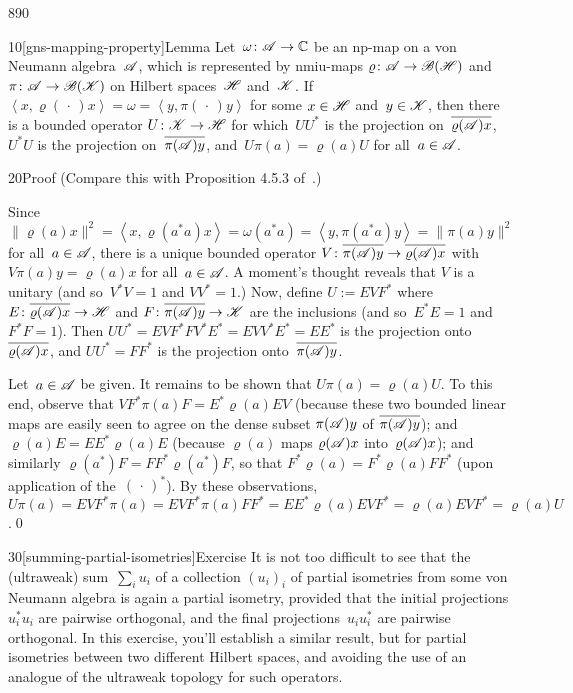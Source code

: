 \begin{parsec}{890}%
\begin{point}{10}[gns-mapping-property]{Lemma}%
Let~$\omega\colon \mathscr{A}\to\mathbb{C}$
be an np-map on a von Neumann algebra~$\mathscr{A}$,
which is represented by nmiu-maps
$\varrho\colon \mathscr{A}\to\mathscr{B}(\mathscr{H})$
and $\pi\colon \mathscr{A}\to\mathscr{B}(\mathscr{K})$
on Hilbert spaces~$\mathscr{H}$ and~$\mathscr{K}$.
If $\left<x,\varrho(\,\cdot\,)x\right>
=\omega=\left<y,\pi(\,\cdot\,)y\right>$
for some  $x\in\mathscr{H}$ and~$y\in\mathscr{K}$,
then there is a bounded operator $U\colon \mathscr{K}\to\mathscr{H}$
for which~$UU^*$ is the projection
on~$\overline{\varrho(\mathscr{A})x}$,
$U^*U$ is the projection
on~$\overline{\pi(\mathscr{A})y}$,
and~$U\pi(a)=\varrho(a)U$
for all~$a\in\mathscr{A}$.
\begin{point}{20}{Proof}%
(Compare this with Proposition 4.5.3 of~\cite{kr}.)

Since $\|\varrho(a)x\|^2
= \left<x,\varrho(a^*a)x\right>
=\omega(a^*a)=\left<y,\pi(a^*a)y\right>
= \|\pi(a)y\|^2$ for all~$a\in\mathscr{A}$,
there is a unique bounded operator $V\colon \overline{\pi(\mathscr{A})y}
\to \overline{\varrho(\mathscr{A})x}$
with $V\pi(a)y = \varrho(a)x$ for all~$a\in\mathscr{A}$.
A moment's thought reveals
	that $V$ is a unitary (and so~$V^*V=1$ and $VV^*=1$.)
Now, define $U:=EVF^*$
where $E\colon \overline{\varrho(\mathscr{A})x}\to\mathscr{H}$
and $F\colon \overline{\pi(\mathscr{A})y}\to\mathscr{K}$
are the inclusions
(and so~$E^*E=1$ and~$F^*F=1$).
Then $UU^*= EVF^*FV^*E^*=EVV^*E^*=EE^*$
is the projection onto~$\overline{\varrho(\mathscr{A})x}$,
and $UU^*=FF^*$
is the projection onto~$\overline{\pi(\mathscr{A})y}$.

Let~$a\in\mathscr{A}$ be given.
It remains to be shown that
$U\pi(a)=\varrho(a)U$.
To this end,
observe that
$V F^* \pi(a) F = E^* \varrho(a) E V$
(because 
these two bounded linear maps
are easily seen to
agree on the dense subset $\pi(\mathscr{A})y$
of $\overline{\pi(\mathscr{A})y}$);
and $\varrho(a)E = EE^*\varrho(a)E$
(because $\varrho(a)$ maps $\varrho(\mathscr{A})x$ into~$\varrho(\mathscr{A})x$);
and similarly $\varrho(a^*)F=FF^*\varrho(a^*) F$,
so that $F^*\varrho(a) = F^* \varrho(a) FF^*$
(upon application of the~$(\,\cdot\,)^*$).
By these observations,  $U\pi(a)=
EVF^*\pi(a)=EVF^*\pi(a) FF^*
= EE^*\varrho(a)EVF^*
= \varrho(a)EVF^*
= \varrho(a)U$.\qed
\end{point}
\end{point}
\begin{point}{30}[summing-partial-isometries]{Exercise}%
It is not too difficult 
to see that the (ultraweak) sum~$\sum_i u_i$
of a collection $(u_i)_i$ 
of partial isometries from some von Neumann algebra
is again a partial isometry, 
provided that the initial projections $u_i^*u_i$
are pairwise orthogonal,
and the final projections~$u_iu_i^*$ are pairwise orthogonal.
In this exercise, you'll establish a similar result,
but for partial isometries between two different Hilbert spaces,
and avoiding the use of an analogue of 
the ultraweak topology for such operators.


\end{point}
\end{parsec}
